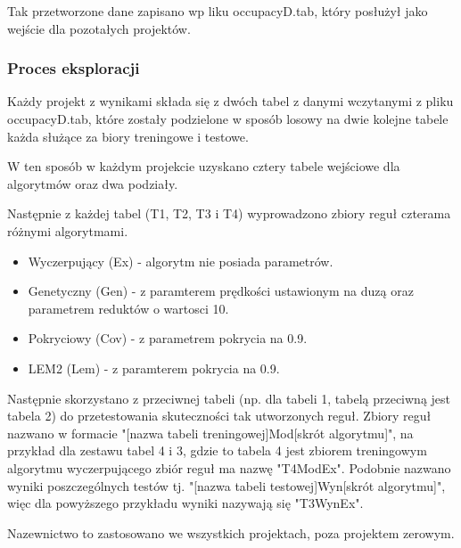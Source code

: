 \documentclass[12pt,oneside,a4paper]{book} %
\theoremstyle{break}
\begin{document}
Tak przetworzone dane zapisano wp liku occupacyD.tab, który posłużył jako wejście dla pozotałych projektów.

\subsubsection*{Proces eksploracji}

Każdy projekt z wynikami składa się z dwóch tabel z danymi wczytanymi z pliku occupacyD.tab, które zostały podzielone w sposób losowy na dwie kolejne tabele każda służące za biory treningowe i testowe.

W ten sposób w każdym projekcie uzyskano cztery tabele wejściowe dla algorytmów oraz dwa podziały.

Następnie z każdej tabel (T1, T2, T3 i T4) wyprowadzono zbiory reguł czterama różnymi algorytmami.

\begin{itemize}
  \item Wyczerpujący (Ex) - algorytm nie posiada parametrów.
  \item Genetyczny (Gen) - z paramterem prędkości ustawionym na duzą oraz parametrem reduktów o wartosci 10.
  \item Pokryciowy (Cov) - z parametrem pokrycia na 0.9.
  \item LEM2 (Lem) - z paramterem pokrycia na 0.9.
\end{itemize}

Następnie skorzystano z przeciwnej tabeli (np. dla tabeli 1, tabelą przeciwną jest tabela 2) do przetestowania skuteczności tak utworzonych reguł. Zbiory reguł nazwano w formacie "[nazwa tabeli treningowej]Mod[skrót algorytmu]", na przykład dla zestawu tabel 4 i 3, gdzie to tabela 4 jest zbiorem treningowym algorytmu wyczerpującego zbiór reguł ma nazwę "T4ModEx". Podobnie nazwano wyniki poszczególnych testów tj. "[nazwa tabeli testowej]Wyn[skrót algorytmu]", więc dla powyższego przykładu wyniki nazywają się "T3WynEx".

Nazewnictwo to zastosowano we wszystkich projektach, poza projektem zerowym.
\end{document}
